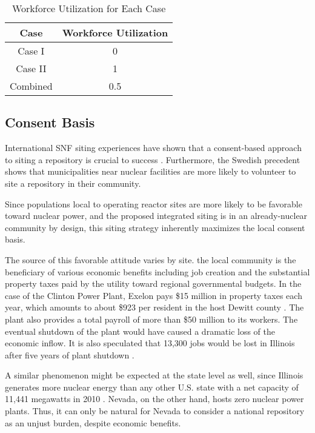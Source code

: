 \begin{table}[h]
	\centering
        \caption {Workforce Utilization for Each Case}
		\begin{tabular}{|c|c|}
			\hline
			Case & Workforce Utilization \\
			\hline
			Case I & 0 \\
			Case II & 1 \\
			Combined & 0.5 \\ 
			\hline
                \end{tabular}
\end{table}


\subsection{Consent Basis}

International \gls{SNF} siting experiences have shown that a consent-based
approach to siting a repository is crucial to success
\cite{ayers_blue_2012,doe_designing_2016,jenkins-smith_public_2013,freeze_siting_2015}. 
Furthermore, the Swedish precedent \cite{olsson_experiences_2013} shows that 
municipalities near nuclear facilities
are more likely to volunteer to site a repository in their community.

Since populations local to operating reactor sites are more likely to be 
favorable toward nuclear power, and the proposed integrated siting 
is in an already-nuclear community by design, this siting strategy inherently 
maximizes the local consent basis.

The source of this favorable attitude varies by site. 
the local community is the beneficiary of various economic benefits
including job creation and the substantial property taxes paid by the utility 
toward regional governmental budgets.   In the case of the Clinton Power Plant, 
Exelon pays \$15 million in property taxes each year, which amounts to about 
\$923 per resident in the host Dewitt county \cite{brady-lunny_dewitt_2016}. The plant
also provides a total payroll of more than \$50 million to its workers.
The eventual shutdown of the plant would have caused a dramatic loss of the economic inflow.
It is also speculated that 13,300 jobs would be lost in Illinois after five years 
of plant shutdown \cite{reid_study:_2014}.  

A similar phenomenon might be expected at the state level as well, since 
Illinois generates more nuclear energy than any other U.S.  state with a net 
capacity of 11,441 megawatts in 2010 \cite{eia_state_2012}. Nevada, on the other 
hand, hosts zero nuclear power plants. Thus, it can only be natural for Nevada 
to consider a national repository as an unjust burden, despite economic 
benefits.  

